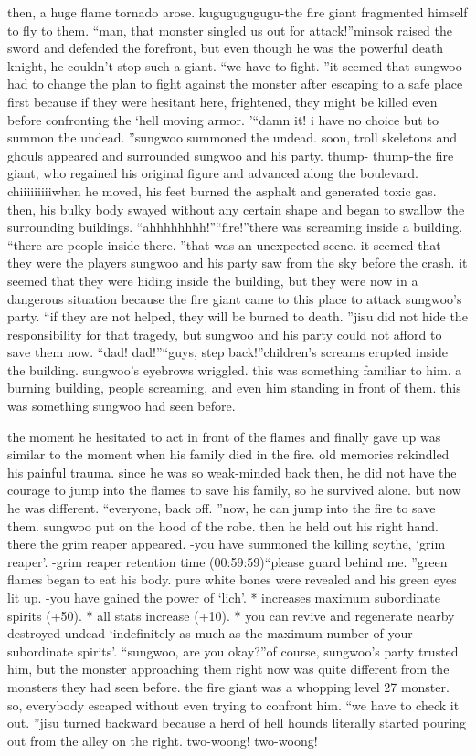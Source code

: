  then, a huge flame tornado arose.
kugugugugugu-the fire giant fragmented himself to fly to them.
“man, that monster singled us out for attack!”minsok raised the sword and defended the forefront, but even though he was the powerful death knight, he couldn’t stop such a giant.
“we have to fight.
”it seemed that sungwoo had to change the plan to fight against the monster after escaping to a safe place first because if they were hesitant here, frightened, they might be killed even before confronting the ‘hell moving armor.
’“damn it! i have no choice but to summon the undead.
”sungwoo summoned the undead.
soon, troll skeletons and ghouls appeared and surrounded sungwoo and his party.
thump- thump-the fire giant, who regained his original figure and advanced along the boulevard.
chiiiiiiiiiwhen he moved, his feet burned the asphalt and generated toxic gas.
 then, his bulky body swayed without any certain shape and began to swallow the surrounding buildings.
“ahhhhhhhh!”“fire!”there was screaming inside a building.
“there are people inside there.
”that was an unexpected scene.
 it seemed that they were the players sungwoo and his party saw from the sky before the crash.
it seemed that they were hiding inside the building, but they were now in a dangerous situation because the fire giant came to this place to attack sungwoo’s party.
“if they are not helped, they will be burned to death.
”jisu did not hide the responsibility for that tragedy, but sungwoo and his party could not afford to save them now.
“dad! dad!”“guys, step back!”children’s screams erupted inside the building.
 sungwoo’s eyebrows wriggled.
this was something familiar to him.
a burning building, people screaming, and even him standing in front of them.
 this was something sungwoo had seen before.


the moment he hesitated to act in front of the flames and finally gave up was similar to the moment when his family died in the fire.
old memories rekindled his painful trauma.
since he was so weak-minded back then, he did not have the courage to jump into the flames to save his family, so he survived alone.
but now he was different.
“everyone, back off.
”now, he can jump into the fire to save them.
sungwoo put on the hood of the robe.
 then he held out his right hand.
there the grim reaper appeared.
-you have summoned the killing scythe, ‘grim reaper’.
-grim reaper retention time (00:59:59)“please guard behind me.
”green flames began to eat his body.
 pure white bones were revealed and his green eyes lit up.
-you have gained the power of ‘lich’.
* increases maximum subordinate spirits (+50).
* all stats increase (+10).
* you can revive and regenerate nearby destroyed undead ‘indefinitely as much as the maximum number of your subordinate spirits’.
“sungwoo, are you okay?”of course, sungwoo’s party trusted him, but the monster approaching them right now was quite different from the monsters they had seen before.
the fire giant was a whopping level 27 monster.
 so, everybody escaped without even trying to confront him.
“we have to check it out.
”jisu turned backward because a herd of hell hounds literally started pouring out from the alley on the right.
two-woong! two-woong!

 